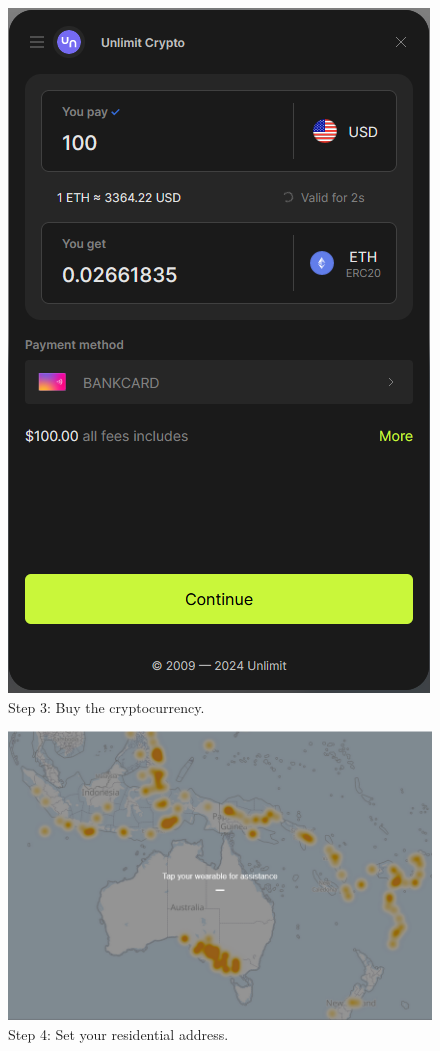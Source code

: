 \documentclass[conference]{IEEEtran}
\begin{document}
\begin{figure}[htbp]
    \centerline{\includegraphics[width=\linewidth]{./figures/buy.png}}
    \caption{Step 3: Buy the cryptocurrency.}
    \label{fig:buy}
\end{figure}

\begin{figure}[htbp]
    \centerline{\includegraphics[width=\linewidth]{./figures/map.png}}
    \caption{Step 4: Set your residential address.}
    \label{fig:map}
\end{figure}
\end{document}
